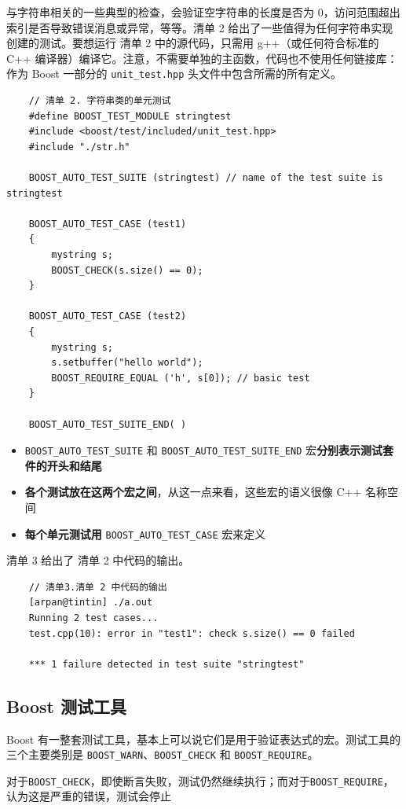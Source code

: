 \documentclass[UTF8,a4paper,12pt]{ctexbook}
\begin{document}
		与字符串相关的一些典型的检查，会验证空字符串的长度是否为 0，访问范围超出索引是否导致错误消息或异常，等等。清单 2 给出了一些值得为任何字符串实现创建的测试。要想运行 清单 2 中的源代码，只需用 g++（或任何符合标准的 C++ 编译器）编译它。注意，不需要单独的主函数，代码也不使用任何链接库：作为 Boost 一部分的 \verb|unit_test.hpp| 头文件中包含所需的所有定义。
			\begin{lstlisting}
	// 清单 2. 字符串类的单元测试
	#define BOOST_TEST_MODULE stringtest
	#include <boost/test/included/unit_test.hpp>
	#include "./str.h"
	
	BOOST_AUTO_TEST_SUITE (stringtest) // name of the test suite is stringtest
	
	BOOST_AUTO_TEST_CASE (test1)
	{
		mystring s;
		BOOST_CHECK(s.size() == 0);
	}
	
	BOOST_AUTO_TEST_CASE (test2)
	{
		mystring s;
		s.setbuffer("hello world");
		BOOST_REQUIRE_EQUAL ('h', s[0]); // basic test 
	}
	
	BOOST_AUTO_TEST_SUITE_END( )			
			\end{lstlisting}
			\begin{itemize}
				\item \verb|BOOST_AUTO_TEST_SUITE| 和 \verb|BOOST_AUTO_TEST_SUITE_END| 宏\textbf{分别表示测试套件的开头和结尾}
				\item \textbf{各个测试放在这两个宏之间}，从这一点来看，这些宏的语义很像 C++ 名称空间
				\item \textbf{每个单元测试用} \verb|BOOST_AUTO_TEST_CASE| 宏来定义
			\end{itemize}
			清单 3 给出了 清单 2 中代码的输出。
			\begin{lstlisting}
	// 清单3.清单 2 中代码的输出
	[arpan@tintin] ./a.out
	Running 2 test cases...
	test.cpp(10): error in "test1": check s.size() == 0 failed
	
	*** 1 failure detected in test suite "stringtest"
			\end{lstlisting}
	
	\subsection{Boost 测试工具}
		Boost 有一整套测试工具，基本上可以说它们是用于验证表达式的宏。测试工具的三个主要类别是 \verb|BOOST_WARN|、\verb|BOOST_CHECK| 和 \verb|BOOST_REQUIRE|。  
		
		 对于\verb|BOOST_CHECK|，即使断言失败，测试仍然继续执行；而对于\verb|BOOST_REQUIRE|，认为这是严重的错误，测试会停止
		 
\end{document}
